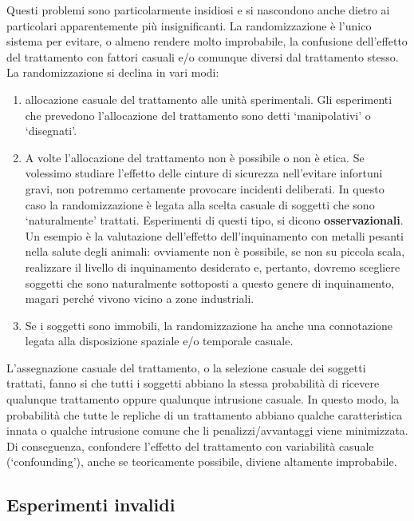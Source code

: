 \documentclass[a4paper,12pt,oneside]{book}
\providecommand{\tightlist}{%
  \setlength{\itemsep}{0pt}\setlength{\parskip}{0pt}}
\begin{document}
Questi problemi sono particolarmente insidiosi e si nascondono anche dietro ai particolari apparentemente più insignificanti. La randomizzazione è l'unico sistema per evitare, o almeno rendere molto improbabile, la confusione dell'effetto del trattamento con fattori casuali e/o comunque diversi dal trattamento stesso. La randomizzazione si declina in vari modi:

\begin{enumerate}
\def\labelenumi{\arabic{enumi}.}
\tightlist
\item
  allocazione casuale del trattamento alle unità sperimentali. Gli esperimenti che prevedono l'allocazione del trattamento sono detti `manipolativi' o `disegnati'.
\item
  A volte l'allocazione del trattamento non è possibile o non è etica. Se volessimo studiare l'effetto delle cinture di sicurezza nell'evitare infortuni gravi, non potremmo certamente provocare incidenti deliberati. In questo caso la randomizzazione è legata alla scelta casuale di soggetti che sono `naturalmente' trattati. Esperimenti di questi tipo, si dicono \textbf{osservazionali}. Un esempio è la valutazione dell'effetto dell'inquinamento con metalli pesanti nella salute degli animali: ovviamente non è possibile, se non su piccola scala, realizzare il livello di inquinamento desiderato e, pertanto, dovremo scegliere soggetti che sono naturalmente sottoposti a questo genere di inquinamento, magari perché vivono vicino a zone industriali.
\item
  Se i soggetti sono immobili, la randomizzazione ha anche una connotazione legata alla disposizione spaziale e/o temporale casuale.
\end{enumerate}

L'assegnazione casuale del trattamento, o la selezione casuale dei soggetti trattati, fanno si che tutti i soggetti abbiano la stessa probabilità di ricevere qualunque trattamento oppure qualunque intrusione casuale. In questo modo, la probabilità che tutte le repliche di un trattamento abbiano qualche caratteristica innata o qualche intrusione comune che li penalizzi/avvantaggi viene minimizzata. Di conseguenza, confondere l'effetto del trattamento con variabilità casuale (`confounding'), anche se teoricamente possibile, diviene altamente improbabile.

\hypertarget{esperimenti-invalidi}{%
\subsection{Esperimenti invalidi}\label{esperimenti-invalidi}}
\end{document}
